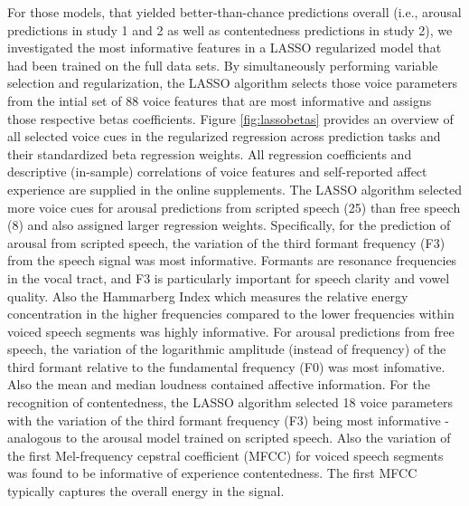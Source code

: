 \documentclass[
  english,
  man,floatsintext]{apa6}
\begin{document}
For those models, that yielded better-than-chance predictions overall (i.e., arousal predictions in study 1 and 2 as well as contentedness predictions in study 2), we investigated the most informative features in a LASSO regularized model that had been trained on the full data sets. By simultaneously performing variable selection and regularization, the LASSO algorithm selects those voice parameters from the intial set of 88 voice features that are most informative and assigns those respective betas coefficients. Figure \ref{fig:lassobetas} provides an overview of all selected voice cues in the regularized regression across prediction tasks and their standardized beta regression weights. All regression coefficients and descriptive (in-sample) correlations of voice features and self-reported affect experience are supplied in the online supplements.
The LASSO algorithm selected more voice cues for arousal predictions from scripted speech (25) than free speech (8) and also assigned larger regression weights.
Specifically, for the prediction of arousal from scripted speech, the variation of the third formant frequency (F3) from the speech signal was most informative. Formants are resonance frequencies in the vocal tract, and F3 is particularly important for speech clarity and vowel quality. Also the Hammarberg Index which measures the relative energy concentration in the higher frequencies compared to the lower frequencies within voiced speech segments was highly informative.
For arousal predictions from free speech, the variation of the logarithmic amplitude (instead of frequency) of the third formant relative to the fundamental frequency (F0) was most infomative. Also the mean and median loudness contained affective information.
For the recognition of contentedness, the LASSO algorithm selected 18 voice parameters with the variation of the third formant frequency (F3) being most informative - analogous to the arousal model trained on scripted speech. Also the variation of the first Mel-frequency cepstral coefficient (MFCC) for voiced speech segments was found to be informative of experience contentedness. The first MFCC typically captures the overall energy in the signal.
\newpage
\end{document}
